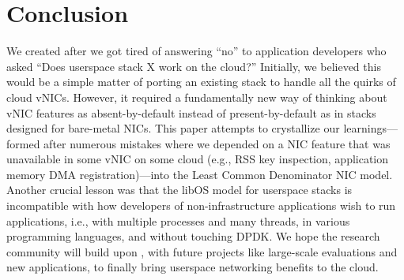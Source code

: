 \section{Conclusion}

We created \mt{} after we got tired of answering ``no'' to application developers who asked ``Does userspace stack X work on the cloud?''
Initially, we believed this would be a simple matter of porting an existing stack to handle all the quirks of cloud vNICs.
However, it required a fundamentally new way of thinking about vNIC features as absent-by-default instead of present-by-default as in stacks designed for bare-metal NICs.
This paper attempts to crystallize our learnings---formed after numerous mistakes where we depended on a NIC feature that was unavailable in some vNIC on some cloud (e.g., RSS key inspection, application memory DMA registration)---into the Least Common Denominator NIC model.
Another crucial lesson was that the libOS model for userspace stacks is incompatible with how developers of non-infrastructure applications wish to run applications, i.e., with multiple processes and many threads, in various programming languages, and without touching DPDK.
We hope the research community will build upon \mt{}, with future projects like large-scale evaluations and new applications, to finally bring userspace networking benefits to the cloud.